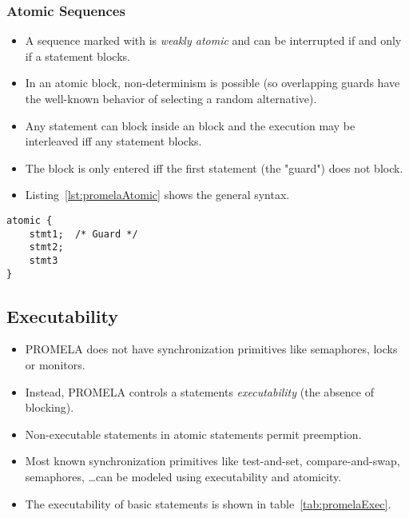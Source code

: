 			\subsubsection{Atomic Sequences}
				\label{sec:atomic}
			
				\begin{itemize}
					\item A sequence marked with  is \textit{weakly atomic} and can be interrupted if and only if a statement blocks.
					\item In an atomic block, non-determinism is possible (so overlapping guards have the well-known behavior of selecting a random alternative).
					\item Any statement can block inside an  block and the execution may be interleaved iff any statement blocks.
					\item The block is only entered iff the first statement (the "guard") does not block.
					\item Listing~\ref{lst:promelaAtomic} shows the general syntax.
				\end{itemize}
			
				\begin{lstlisting}[caption = { Atomic Sequence in PROMELA }, label = lst:promelaAtomic, language = PROMELA]
atomic {
	stmt1;  /* Guard */
	stmt2;
	stmt3
}
				\end{lstlisting}

		\subsection{Executability} %
			\label{sec:promelaExec}
		
			\begin{itemize}
				\item PROMELA does not have synchronization primitives like semaphores, locks or monitors.
				\item Instead, PROMELA controls a statements \textit{executability} (the absence of blocking).
				\item Non-executable statements in atomic statements permit preemption.
				\item Most known synchronization primitives like test-and-set, compare-and-swap, semaphores, \dots can be modeled using executability and atomicity.
				\item The executability of basic statements is shown in table~\ref{tab:promelaExec}.
			\end{itemize}
		
